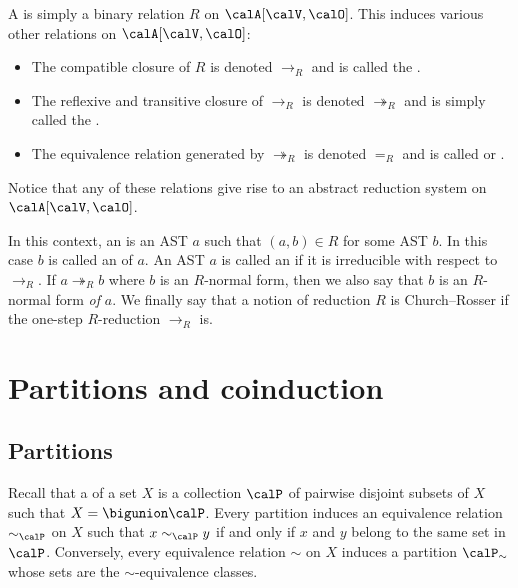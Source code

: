 A  is simply a binary relation $R$ on $\setAST{\setVarAST}{\setOp}$. This induces various other relations on $\setAST{\setVarAST}{\setOp}$:
%
\begin{itemize}
    \item The compatible closure of $R$ is denoted $\to_R$ and is called the .
    \item The reflexive and transitive closure of $\to_R$ is denoted $\twoheadrightarrow_R$ and is simply called the .
    \item The equivalence relation generated by $\twoheadrightarrow_R$ is denoted $=_R$ and is called  or .
\end{itemize}
%
Notice that any of these relations give rise to an abstract reduction system on $\setAST{\setVarAST}{\setOp}$.

In this context, an  is an AST $a$ such that $(a,b) \in R$ for some AST $b$. In this case $b$ is called an  of $a$. An AST $a$ is called an  if it is irreducible with respect to $\to_R$. If $a \twoheadrightarrow_R b$ where $b$ is an $R$-normal form, then we also say that $b$ is an $R$-normal form \emph{of} $a$. We finally say that a notion of reduction $R$ is Church--Rosser if the one-step $R$-reduction $\to_R$ is.


\section{Partitions and coinduction}

\subsection{Partitions}

Recall that a  of a set $X$ is a collection $\calP$ of pairwise disjoint subsets of $X$ such that $X = \bigunion \calP$. Every partition induces an equivalence relation $\sim_{\calP}$ on $X$ such that $x \sim_{\calP} y$ if and only if $x$ and $y$ belong to the same set in $\calP$. Conversely, every equivalence relation $\sim$ on $X$ induces a partition $\calP_\sim$ whose sets are the $\sim$-equivalence classes.

